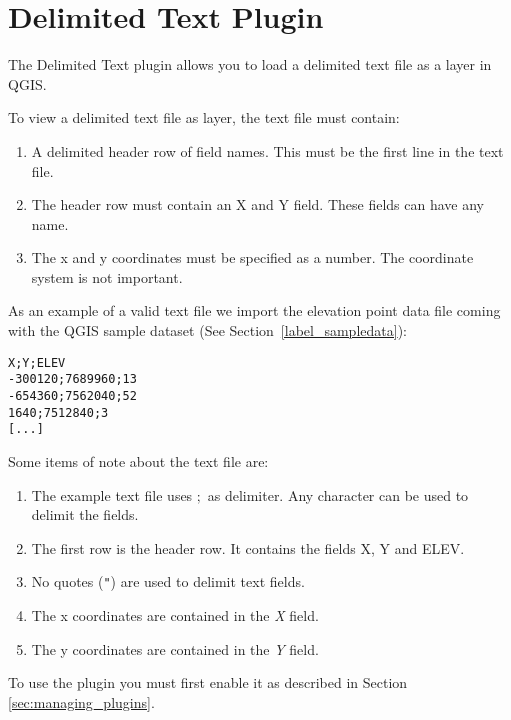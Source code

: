 
\section{Delimited Text Plugin}\label{label_dltext}    


The Delimited Text plugin allows you to load a delimited text file as a layer in QGIS. 


To view a delimited text file as layer, the text file must contain:

\begin{enumerate}      
\item A delimited header row of field names. This must be the first line in the text file.
\item The header row must contain an X and Y field. These fields can have any name.
\item The x and y coordinates must be specified as a number. The coordinate system is not important.
\end{enumerate}

As an example of a valid text file we import the elevation point data file 
 coming with the QGIS sample dataset (See Section~\ref{label_sampledata}):

\begin{verbatim} 
X;Y;ELEV
-300120;7689960;13
-654360;7562040;52
1640;7512840;3
[...]
\end{verbatim}

Some items of note about the text file are:

\begin{enumerate}
\item The example text file uses \mbox{$;$} as delimiter. Any character can be used to delimit the fields.
\item The first row is the header row. It contains the fields X, Y and ELEV.
\item No quotes ({\tt{}"{}}) are used to delimit text fields.
\item The x coordinates are contained in the {\em X} field.
\item The y coordinates are contained in the {\em Y} field.
\end{enumerate}

To use the plugin you must first enable it as described in Section \ref{sec:managing_plugins}.

